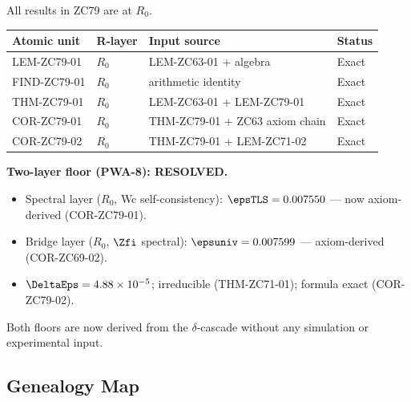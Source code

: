 \documentclass[12pt, a4paper]{article}
\begin{document}
\begin{layerbox}[title={R-Layer Assignments for ZC79}]
All results in ZC79 are at $R_0$.

{\small\renewcommand{\arraystretch}{1.25}
\begin{center}
\begin{tabular}{@{}llll@{}}
\toprule
Atomic unit & R-layer & Input source & Status \\
\midrule
LEM-ZC79-01 & $R_0$ & LEM-ZC63-01 + algebra & Exact \\
FIND-ZC79-01& $R_0$ & arithmetic identity & Exact \\
THM-ZC79-01 & $R_0$ & LEM-ZC63-01 + LEM-ZC79-01 & Exact \\
COR-ZC79-01 & $R_0$ & THM-ZC79-01 + ZC63 axiom chain & Exact \\
COR-ZC79-02 & $R_0$ & THM-ZC79-01 + LEM-ZC71-02 & Exact \\
\bottomrule
\end{tabular}
\end{center}}

\textbf{Two-layer floor (PWA-8): RESOLVED.}
\begin{itemize}[leftmargin=2em, noitemsep]
  \item Spectral layer ($R_0$, Wc self-consistency):
    $\epsTLS = 0.007550$ --- now axiom-derived (COR-ZC79-01).
  \item Bridge layer ($R_0$, $\Zfi$ spectral):
    $\epsuniv = 0.007599$ --- axiom-derived (COR-ZC69-02).
  \item $\DeltaEps = 4.88\times10^{-5}$; irreducible (THM-ZC71-01);
    formula exact (COR-ZC79-02).
\end{itemize}
Both floors are now derived from the $\delta$-cascade without
any simulation or experimental input.
\end{layerbox}

\subsection{Genealogy Map}
\label{sec:genealogy}
\end{document}
